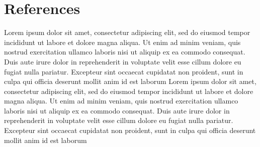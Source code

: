 \documentclass[twoside,twocolumn]{article}                          %
\begin{document}
\section{References}
Lorem ipsum dolor sit amet, consectetur adipiscing elit, sed do eiusmod tempor incididunt ut labore et dolore magna aliqua. Ut enim ad minim veniam, quis nostrud exercitation ullamco laboris nisi ut aliquip ex ea commodo consequat. Duis aute irure dolor in reprehenderit in voluptate velit esse cillum dolore eu fugiat nulla pariatur. Excepteur sint occaecat cupidatat non proident, sunt in culpa qui officia deserunt mollit anim id est laborum
Lorem ipsum dolor sit amet, consectetur adipiscing elit, sed do eiusmod tempor incididunt ut labore et dolore magna aliqua. Ut enim ad minim veniam, quis nostrud exercitation ullamco laboris nisi ut aliquip ex ea commodo consequat. Duis aute irure dolor in reprehenderit in voluptate velit esse cillum dolore eu fugiat nulla pariatur. Excepteur sint occaecat cupidatat non proident, sunt in culpa qui officia deserunt mollit anim id est laborum
\end{document}
